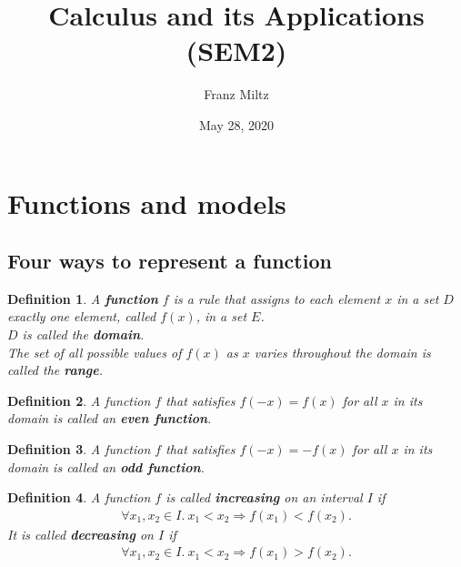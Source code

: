 \documentclass{article}
\theoremstyle{sltheorem}
\newtheorem{definition}{Definition}[section]
\begin{document}
\title{Calculus and its Applications (SEM2)}
\author{Franz Miltz}
\date{May 28, 2020}
\maketitle
\tableofcontents
\section{Functions and models}
\subsection{Four ways to represent a function}
\begin{definition}
    A \textbf{function} $f$ is a rule that assigns to each element $x$ in a set $D$ exactly one element, called $f(x)$, in a set $E$.\\
    $D$ is called the \textbf{domain}.\\
    The set of all possible values of $f(x)$ as $x$ varies throughout the domain is called the \textbf{range}.\\
\end{definition}
\begin{definition}
    A function $f$ that satisfies $f(-x)=f(x)$ for all $x$ in its domain is called an \textbf{even function}.
\end{definition}
\begin{definition}
    A function $f$ that satisfies $f(-x)=-f(x)$ for all $x$ in its domain is called an \textbf{odd function}.
\end{definition}
\begin{definition}
    A function $f$ is called \textbf{increasing} on an interval $I$ if
    \begin{align*}
        \forall x_1, x_2 \in I.\:x_1 < x_2 \Rightarrow f(x_1) < f(x_2).
    \end{align*}
    It is called \textbf{decreasing} on $I$ if
    \begin{align*}
        \forall x_1, x_2 \in I.\: x_1 < x_2 \Rightarrow f(x_1) > f(x_2).
    \end{align*}
\end{definition}
\end{document}
